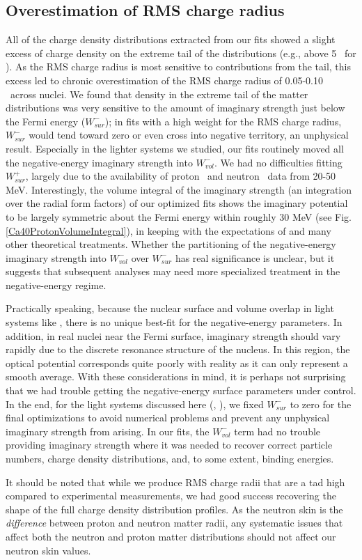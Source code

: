 \subsection{Overestimation of RMS charge radius}
All of the charge density distributions extracted from our fits showed a slight
excess of charge density on the extreme tail of the distributions (e.g., above 5 
\femto\meter\ for \caForty). As the RMS charge radius is most sensitive to
contributions from the tail, this excess led to chronic overestimation of the RMS
charge radius of 0.05-0.10 \femto\meter\ across nuclei.
We found that density in the extreme tail of the matter distributions was very
sensitive to the amount of imaginary strength just below the Fermi energy
($W_{sur}^{-}$); in fits with a high weight for the RMS charge radius,
$W_{sur}^{-}$ would tend toward zero or even cross into negative territory, an
unphysical result. Especially in the lighter systems we studied, our fits routinely
moved all the negative-energy imaginary strength into $W_{vol}^{-}$.
We had no difficulties fitting $W_{sur}^{+}$, largely due to the
availability of proton \rxn\ and neutron \tot\ data from 20-50 MeV.
Interestingly, the volume
integral of the imaginary strength (an integration over the
radial form factors) of our optimized fits shows the imaginary potential to be largely symmetric
about the Fermi energy within roughly 30 MeV (see Fig. \ref{Ca40ProtonVolumeIntegral}),
in keeping with the expectations of \cite{Mahaux1991} and many other theoretical
treatments. Whether the partitioning
of the negative-energy imaginary strength into $W_{vol}^{-}$ over $W_{sur}^{-}$
has real significance is unclear, but it suggests that subsequent 
analyses may need more specialized treatment in the negative-energy regime.

Practically speaking, because the nuclear surface and volume overlap
in light systems like \oSix, there is no unique best-fit for the
negative-energy parameters. In addition, in real nuclei near the Fermi surface,
imaginary strength should vary rapidly due to the discrete resonance structure of
the nucleus. In this region, the optical potential corresponds quite poorly
with reality as it can only represent a smooth average. With these
considerations in mind, it is perhaps
not surprising that we had trouble getting
the negative-energy surface parameters under control. In the end, for the light systems
discussed here (\oSixEight, \caAughtEight), we fixed $W_{sur}^{-}$ to zero for
the final optimizations to avoid numerical problems and prevent any
unphysical imaginary strength from arising. In our fits, the
$W_{vol}^{-}$ term had no trouble providing imaginary strength where it was
needed to recover correct particle numbers, charge density distributions, and,
to some extent, binding energies.

It should be noted that while we produce RMS charge radii that are a tad high
compared to experimental measurements, we had good success recovering the shape
of the full charge density distribution profiles. As the neutron skin is the
\textit{difference} between proton and neutron matter radii, any systematic
issues that affect both the neutron and proton matter distributions should not
affect our neutron skin values.
\afterpage{\clearpage}
